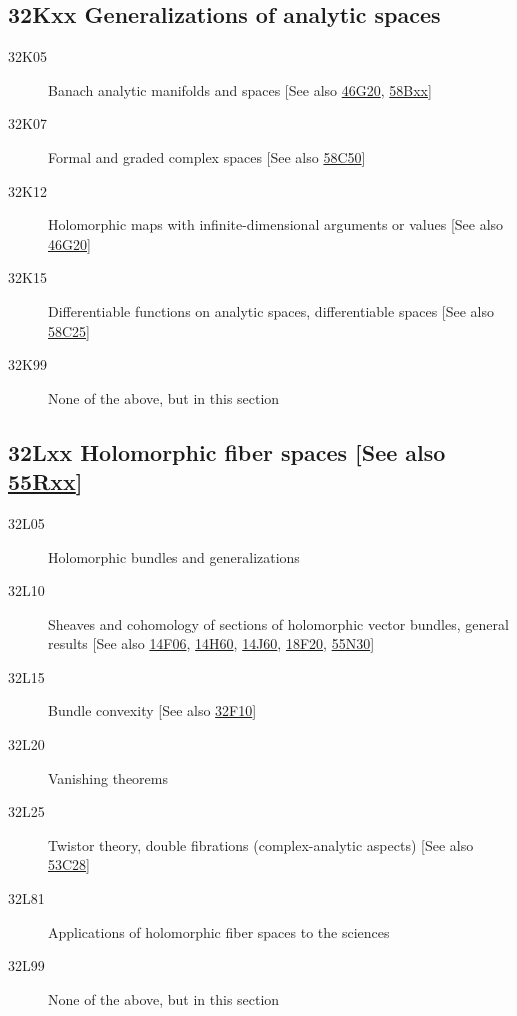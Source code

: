\documentclass[letterpaper]{article}
\begin{document}
\subsection*{32Kxx  Generalizations of analytic spaces }\label{32Kxx}
\begin{description}  
\item [32K05]\label{32K05} Banach analytic manifolds and spaces [See also \hyperref[46G20]{46G20}, \hyperref[58Bxx]{58Bxx}]
\item [32K07]\label{32K07} Formal and graded complex spaces [See also \hyperref[58C50]{58C50}]
\item [32K12]\label{32K12} Holomorphic maps with infinite-dimensional arguments or values [See also \hyperref[46G20]{46G20}]
\item [32K15]\label{32K15} Differentiable functions on analytic spaces, differentiable spaces [See also \hyperref[58C25]{58C25}]
\item [32K99]\label{32K99} None of the above, but in this section
\end{description}
\subsection*{32Lxx  Holomorphic fiber spaces [See also \hyperref[55Rxx]{55Rxx}] }\label{32Lxx}
\begin{description}  
\item [32L05]\label{32L05} Holomorphic bundles and generalizations
\item [32L10]\label{32L10} Sheaves and cohomology of sections of holomorphic vector bundles, general results [See also \hyperref[14F06]{14F06}, \hyperref[14H60]{14H60}, \hyperref[14J60]{14J60}, \hyperref[18F20]{18F20}, \hyperref[55N30]{55N30}]
\item [32L15]\label{32L15} Bundle convexity [See also \hyperref[32F10]{32F10}]
\item [32L20]\label{32L20} Vanishing theorems
\item [32L25]\label{32L25} Twistor theory, double fibrations (complex-analytic aspects) [See also \hyperref[53C28]{53C28}]
\item [32L81]\label{32L81} Applications of holomorphic fiber spaces to the sciences
\item [32L99]\label{32L99} None of the above, but in this section
\end{description}
\end{document}
